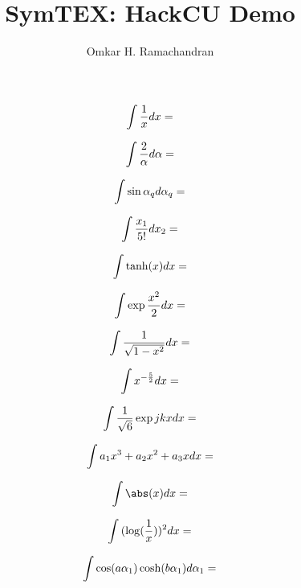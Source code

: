 \documentclass[english]{article}
\newcommand{\eval}[1]{\immediate\write18{python3 symtex.py '#1' > intermediate.txt}}
\begin{document}
\title{SymTEX: HackCU Demo}

\author{Omkar H. Ramachandran}
\maketitle

$$ \intop{\frac{1}{x} dx} = \eval{\intop{frac{1}{x} dx}} $$


$$ \intop{\frac{2}{\alpha} d\alpha} = \eval{\intop{frac{2}{alpha} dalpha}} $$

$$ \intop{\sin{\alpha_q} d\alpha_q} = \eval{\intop{sin{alpha_q} dalpha_q}} $$

$$ \intop{\frac{x_1}{5!} dx_2} = \eval{\intop{frac{x_1}{5!} dx_2}} $$

$$ \intop{\tanh(x) dx} = \eval{\intop{tanh(x) dx}} $$

$$ \intop{\exp{\frac{x^2}{2}} dx} = \eval{\intop{exp{frac{x^2}{2}} dx}} $$

$$ \intop{\frac{1}{\sqrt{1 - x^2}} dx} = \eval{\intop{frac{1}{sqrt{1 - x^2}} dx}} $$

$$ \intop{x^{-\frac{5}{2}} dx} = \eval{\intop{x^{-frac{5}{2}} dx}} $$

$$ \intop{\frac{1}{\sqrt{6}} \exp{j k x} dx} = \eval{\intop{frac{1}{sqrt{6}} exp{j k x} dx}}$$

$$ \intop{a_1 x^3 + a_2 x^2 + a_3 x dx} = \eval{\intop{a_1 x^3 + a_2 x^2 + a_3 x dx}}$$

$$ \intop{\abs(x) dx} = \eval{\intop{abs(x) dx}} $$

$$ \intop{(\log(\frac{1}{x}))^2 dx} = \eval{\intop{(log(frac{1}{x}))^2 dx}} $$

$$ \intop{\cos(a \alpha_1) \cosh(b \alpha_1) d\alpha_1} = \eval{\intop{cos(a alpha_1) cosh(b alpha_1) dalpha_1}} $$
\end{document}
